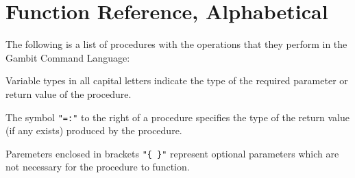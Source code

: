 \section{Function Reference, Alphabetical}

The following is a list of procedures with the operations that they
perform in the Gambit Command Language:

Variable types in all capital letters indicate the type of the
required parameter or return value of the procedure.

The symbol {\tt "=:"} to the right of a procedure specifies the type
of the return value (if any exists) produced by the procedure.

Paremeters enclosed in brackets {\tt "\{ \}"} represent optional
parameters which are not necessary for the procedure to function.

